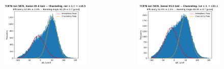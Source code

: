 \documentclass[10pt]{beamer}
\begin{document}
\begin{frame}
\begin{columns}[c]
\begin{figure}
\includegraphics[width=0.9\linewidth]{half_thetac_chan_histo.pdf}\\
\end{figure}%
\vspace{-0.5cm}%
\begin{figure}
\includegraphics[width=0.9\linewidth]{thetac_chan_histo.pdf}\\
\end{figure}



\end{columns}
\end{frame}
\end{document}

